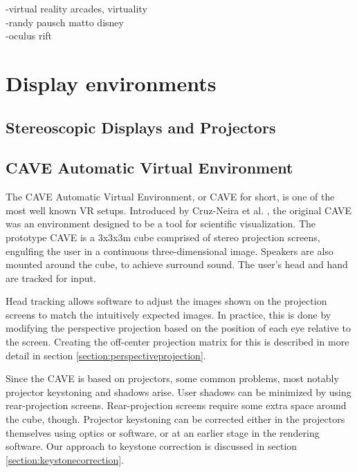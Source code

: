 \documentclass[12pt,a4paper,oneside,pdftex]{report}
\begin{document}
-virtual reality arcades, virtuality \\
-randy pausch matto disney \cite{PauschDisney} \\
-oculus rift



\section{Display environments}
\label{section:displayenvironments}

\subsection{Stereoscopic Displays and Projectors}
\label{subsection:displayenvironments:stereoscopic}


\subsection{CAVE Automatic Virtual Environment}
\label{subsection:displayenvironments:cave}

The CAVE Automatic Virtual Environment, or CAVE for short, is one of the most well known VR setups. Introduced by Cruz-Neira et al. \cite{CAVE1, CAVE2}, the original CAVE was an environment designed to be a tool for scientific visualization. The prototype CAVE is a 3x3x3m cube comprised of stereo projection screens, engulfing the user in a continuous three-dimensional image. Speakers are also mounted around the cube, to achieve surround sound. The user's head and hand are tracked for input.

Head tracking allows software to adjust the images shown on the projection screens to match the intuitively expected images. In practice, this is done by modifying the perspective projection based on the position of each eye relative to the screen. Creating the off-center projection matrix for this is described in more detail in section \ref{section:perspectiveprojection}.

Since the CAVE is based on projectors, some common problems, most notably projector keystoning and shadows arise. User shadows can be minimized by using rear-projection screens. Rear-projection screens require some extra space around the cube, though. Projector keystoning can be corrected either in the projectors themselves using optics or software, or at an earlier stage in the rendering software. Our approach to keystone correction is discussed in section \ref{section:keystonecorrection}.
\end{document}
